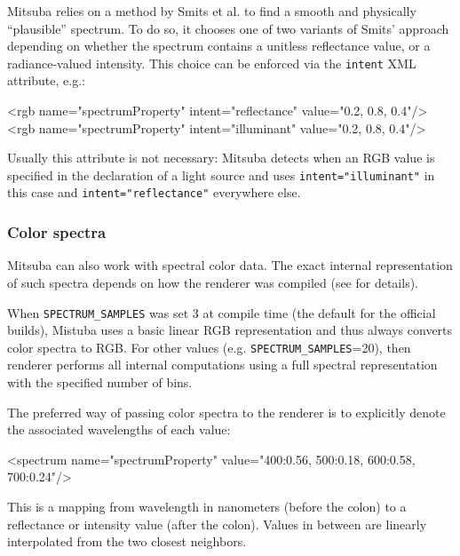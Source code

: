 Mitsuba relies on a method by Smits et al. \cite{Smits2005RGB} to find a
smooth and physically ``plausible'' spectrum. To do so, it chooses
one of two variants of Smits' approach depending on whether the spectrum contains a
unitless reflectance value, or a radiance-valued intensity. This choice can be
enforced via the \texttt{intent} XML attribute, e.g.:
\begin{xml}
<rgb name="spectrumProperty" intent="reflectance" value="0.2, 0.8, 0.4"/>
<rgb name="spectrumProperty" intent="illuminant" value="0.2, 0.8, 0.4"/>
\end{xml}
Usually this attribute is not necessary:
Mitsuba detects when an RGB value is specified in the declaration of a light source
and uses \texttt{intent="illuminant"} in this case and \texttt{intent="reflectance"}
everywhere else.

\subsubsection{Color spectra}
\label{sec:format-spectra}
Mitsuba can also work with spectral color data. The exact internal representation of
such spectra depends on how the renderer was compiled (see  for
details).

When \texttt{SPECTRUM\_SAMPLES} was set 3 at compile time (the default for the official builds),
Mistuba uses a basic linear RGB representation and thus always converts color spectra to RGB.
For other values (e.g. \texttt{SPECTRUM\_SAMPLES}=20), then renderer performs all internal
computations using a full spectral representation with the specified number of bins.

The preferred way of passing color spectra to the renderer is to explicitly
denote the  associated wavelengths of each value:
\begin{xml}
<spectrum name="spectrumProperty" value="400:0.56, 500:0.18, 600:0.58, 700:0.24"/>
\end{xml}
This is a mapping from wavelength in nanometers (before the colon)
to a reflectance or intensity value (after the colon).
Values in between are linearly interpolated from the two closest neighbors.

